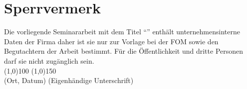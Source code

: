 \section*{Sperrvermerk}
Die vorliegende Seminararbeit mit dem Titel ``\MyTitel{}'' enthält unternehmensinterne Daten der Firma \MyFirma{} daher ist sie nur zur Vorlage bei der FOM sowie den Begutachtern der Arbeit bestimmt. Für die Öffentlichkeit und dritte Personen darf sie nicht zugänglich sein.
\\[5cm]
\line(1,0){100} \hfill \line(1,0){150}\\
(Ort, Datum) \hfill (Eigenhändige Unterschrift)
